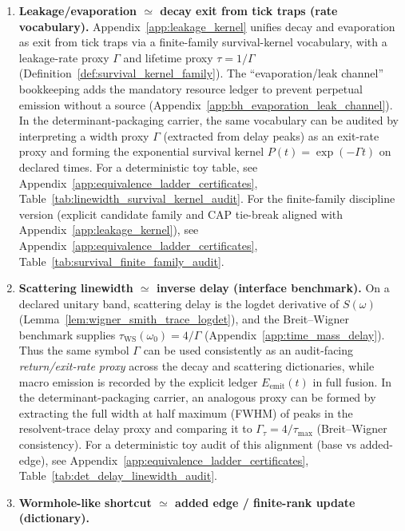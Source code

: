 \begin{remark}
\begin{enumerate}
a delay-driven scattering queue (service cost $\tau_{\mathrm{WS}}$) versus a BH-like internal queue that emits a stable-label record $w_t\in X_6$.
The side-by-side saturation/backlog equivalence audit is Table~\ref{tab:scattering_bh_queue_equivalence_toy}.
\item \textbf{Leakage/evaporation $\simeq$ decay exit from tick traps (rate vocabulary).}
Appendix~\ref{app:leakage_kernel} unifies decay and evaporation as exit from tick traps via a finite-family survival-kernel vocabulary,
with a leakage-rate proxy $\Gamma$ and lifetime proxy $\tau=1/\Gamma$ (Definition~\ref{def:survival_kernel_family}).
The ``evaporation/leak channel'' bookkeeping adds the mandatory resource ledger to prevent perpetual emission without a source
(Appendix~\ref{app:bh_evaporation_leak_channel}).
In the determinant-packaging carrier, the same vocabulary can be audited by interpreting a width proxy $\Gamma$ (extracted from delay peaks)
as an exit-rate proxy and forming the exponential survival kernel $P(t)=\exp(-\Gamma t)$ on declared times. For a deterministic toy table,
see Appendix~\ref{app:equivalence_ladder_certificates}, Table~\ref{tab:linewidth_survival_kernel_audit}.
For the finite-family discipline version (explicit candidate family and CAP tie-break aligned with Appendix~\ref{app:leakage_kernel}), see
Appendix~\ref{app:equivalence_ladder_certificates}, Table~\ref{tab:survival_finite_family_audit}.
\item \textbf{Scattering linewidth $\simeq$ inverse delay (interface benchmark).}
On a declared unitary band, scattering delay is the logdet derivative of $S(\omega)$ (Lemma~\ref{lem:wigner_smith_trace_logdet}),
and the Breit--Wigner benchmark supplies $\tau_{\mathrm{WS}}(\omega_0)=4/\Gamma$ (Appendix~\ref{app:time_mass_delay}).
Thus the same symbol $\Gamma$ can be used consistently as an audit-facing \emph{return/exit-rate proxy} across the decay and scattering dictionaries,
while macro emission is recorded by the explicit ledger $E_{\mathrm{emit}}(t)$ in full fusion.
In the determinant-packaging carrier, an analogous proxy can be formed by extracting the full width at half maximum (FWHM) of peaks in the resolvent-trace delay proxy
and comparing it to $\Gamma_\tau=4/\tau_{\max}$ (Breit--Wigner consistency). For a deterministic toy audit of this alignment (base vs added-edge),
see Appendix~\ref{app:equivalence_ladder_certificates}, Table~\ref{tab:det_delay_linewidth_audit}.
\item \textbf{Wormhole-like shortcut $\simeq$ added edge / finite-rank update (dictionary).}

\end{enumerate}
\end{remark}
